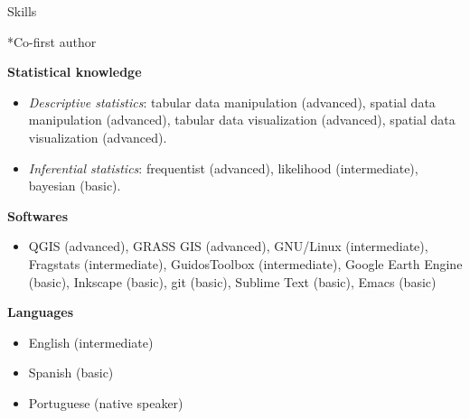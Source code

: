 \documentclass{resume}
\begin{document}
\begin{rSection}{Skills}
\begin{itemize}
\end{itemize} 

*Co-first author

{\bf Statistical knowledge}

\begin{itemize} 
\item {\it Descriptive statistics}: tabular data manipulation (advanced), spatial data manipulation (advanced), tabular data visualization (advanced), spatial data visualization (advanced).

\item {\it Inferential statistics}: frequentist (advanced), likelihood (intermediate), bayesian (basic).
\end{itemize}

{\bf Softwares}
\begin{itemize}
\item QGIS (advanced), GRASS GIS (advanced), GNU/Linux (intermediate), Fragstats (intermediate), GuidosToolbox (intermediate), Google Earth Engine (basic), Inkscape (basic), git (basic), Sublime Text (basic), Emacs (basic)
\end{itemize}

{\bf Languages}
\begin{itemize}
\item English (intermediate)
\item Spanish (basic)
\item Portuguese (native speaker)
\end{itemize}

\end{rSection}

\end{document}
